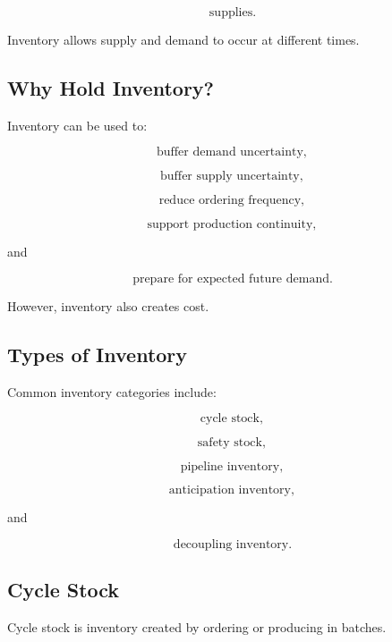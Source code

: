 \[
\boxed{
\text{supplies}.
}
\]

Inventory allows supply and demand to occur at different times.

\subsection{Why Hold Inventory?}
\label{subsec:why-hold-inventory}

Inventory can be used to:

\[
\boxed{
\text{buffer demand uncertainty},
}
\]

\[
\boxed{
\text{buffer supply uncertainty},
}
\]

\[
\boxed{
\text{reduce ordering frequency},
}
\]

\[
\boxed{
\text{support production continuity},
}
\]

and

\[
\boxed{
\text{prepare for expected future demand}.
}
\]

However, inventory also creates cost.

\subsection{Types of Inventory}
\label{subsec:types-of-inventory}

Common inventory categories include:

\[
\boxed{
\text{cycle stock},
}
\]

\[
\boxed{
\text{safety stock},
}
\]

\[
\boxed{
\text{pipeline inventory},
}
\]

\[
\boxed{
\text{anticipation inventory},
}
\]

and

\[
\boxed{
\text{decoupling inventory}.
}
\]

\subsection{Cycle Stock}
\label{subsec:cycle-stock}

Cycle stock is inventory created by ordering or producing in batches.

